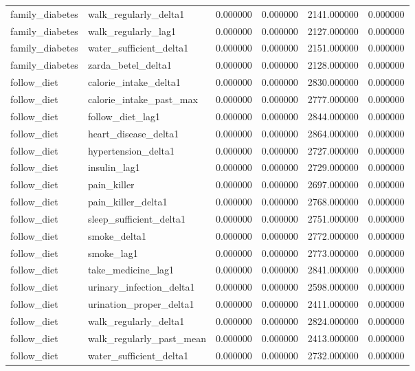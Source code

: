 \begin{longtable}{llrrrr}
family\_diabetes & walk\_regularly\_delta1 & 0.000000 & 0.000000 & 2141.000000 & 0.000000 \\
family\_diabetes & walk\_regularly\_lag1 & 0.000000 & 0.000000 & 2127.000000 & 0.000000 \\
family\_diabetes & water\_sufficient\_delta1 & 0.000000 & 0.000000 & 2151.000000 & 0.000000 \\
family\_diabetes & zarda\_betel\_delta1 & 0.000000 & 0.000000 & 2128.000000 & 0.000000 \\
follow\_diet & calorie\_intake\_delta1 & 0.000000 & 0.000000 & 2830.000000 & 0.000000 \\
follow\_diet & calorie\_intake\_past\_max & 0.000000 & 0.000000 & 2777.000000 & 0.000000 \\
follow\_diet & follow\_diet\_lag1 & 0.000000 & 0.000000 & 2844.000000 & 0.000000 \\
follow\_diet & heart\_disease\_delta1 & 0.000000 & 0.000000 & 2864.000000 & 0.000000 \\
follow\_diet & hypertension\_delta1 & 0.000000 & 0.000000 & 2727.000000 & 0.000000 \\
follow\_diet & insulin\_lag1 & 0.000000 & 0.000000 & 2729.000000 & 0.000000 \\
follow\_diet & pain\_killer & 0.000000 & 0.000000 & 2697.000000 & 0.000000 \\
follow\_diet & pain\_killer\_delta1 & 0.000000 & 0.000000 & 2768.000000 & 0.000000 \\
follow\_diet & sleep\_sufficient\_delta1 & 0.000000 & 0.000000 & 2751.000000 & 0.000000 \\
follow\_diet & smoke\_delta1 & 0.000000 & 0.000000 & 2772.000000 & 0.000000 \\
follow\_diet & smoke\_lag1 & 0.000000 & 0.000000 & 2773.000000 & 0.000000 \\
follow\_diet & take\_medicine\_lag1 & 0.000000 & 0.000000 & 2841.000000 & 0.000000 \\
follow\_diet & urinary\_infection\_delta1 & 0.000000 & 0.000000 & 2598.000000 & 0.000000 \\
follow\_diet & urination\_proper\_delta1 & 0.000000 & 0.000000 & 2411.000000 & 0.000000 \\
follow\_diet & walk\_regularly\_delta1 & 0.000000 & 0.000000 & 2824.000000 & 0.000000 \\
follow\_diet & walk\_regularly\_past\_mean & 0.000000 & 0.000000 & 2413.000000 & 0.000000 \\
follow\_diet & water\_sufficient\_delta1 & 0.000000 & 0.000000 & 2732.000000 & 0.000000 \\

\end{longtable}
